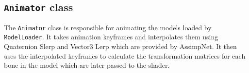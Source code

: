 \subsection{\texttt{Animator} class}\label{subsec:animator-class}

The \texttt{Animator} class is responsible for animating the models loaded by \texttt{ModelLoader}.
It takes animation keyframes and interpolates them using Quaternion Slerp and Vector3 Lerp which are provided by AssimpNet.
It then uses the interpolated keyframes to calculate the transformation matrices for each bone in the model which are later passed to the shader.

